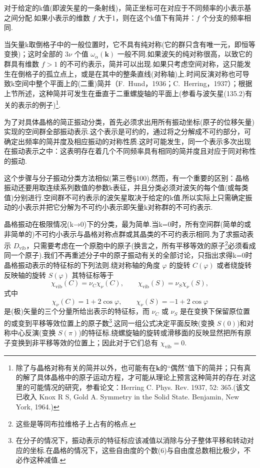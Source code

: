 对于给定的k值(即波矢星的一条射线)，简正坐标可在对应于不同频率的小表示基之间分配.如果小表示的维数 $f$ 大于1，则在这个k值下有简并：$f$ 个分支的频率相同.

当矢量k取倒格子中的一般位置时，它不具有纯对称(它的群只含有唯一元，即恒等变换)；这时全部的 $3\nu$ 个值 $\omega_\alpha(\boldsymbol{k})$ 一般不同.如果波矢的纯对称很高，以致它的群具有维数 $f>1$ 的不可约表示，简并可以出现.如果只考虑空间对称，这只能发生在倒格子的孤立点上，或是在其中的整条直线(对称轴)上.时间反演对称也可导致k空间中整个平面上的(二重)简并（F.~Hund，1936；C.~Herring，1937）；根据上节所述，这种简并可发生在垂直于二重螺旋轴的平面上(参看与波矢星(135.2)有关的表示的例子)\footnote{除了与晶格对称有关的简并以外，也可能有在$\boldsymbol{k}$的“偶然”值下的简并；只有真的解了具体晶格中的原子运动方程，才可能从理论上预言这种简并的存在.对这里的可能情况的研究，参看论文：Herring C. Phys. Rev. 1937, 52: 365.(该文已收入 Knox R S, Gold A. Symmetry in the Solid State. Benjamin, New York, 1964.)}.

为了对具体晶格的简正振动分类，首先必须求出用所有振动坐标(原子的位移矢量)实现的空间群全部振动表示.这个表示是可约的，通过将之分解成不可约部分，可确定出频率的简并度及相应振动的对称性质.这时可能发生，同一个表示多次出现在振动表示之中：这表明存在着几个不同频率具有相同的简并度且对应于同对称性的振动.

这个步骤与分子振动分类方法相似(第三卷§100).然而，有一个重要的区别：晶格振动还要用取连续系列数值的参数k表征，并且分类必须对波矢的每个值(或每类值)分别进行.空间群不可约表示的波矢星取决于给定的k值.所以实际上只需确定振动的小表示并把它分解为不可约小表示即矢量k对称群的不可约表示.

晶格振动在极限情况(k→0)下的分类，最为简单.当k=0时，所有空间群(简单的或非简单的)不可约小表示与晶格对称点群或其晶类的不可约表示相同.为了求振动表示 $D_{\mathrm{vib}}$，只需要考虑在一个原胞中的原子(换言之，所有平移等效的原子\footnote{这些是等同布拉维格子上占有的格点.}必须看成同一个原子).我们不再重述分子中的原子振动有关的全部讨论，只指出求得k=0时晶格振动表示的特征标的下列法则.绕对称轴的角度 $\varphi$ 的旋转 $C(\varphi)$ 或者绕旋转反映轴的旋转 $S(\varphi)$ 其特征标等于
\begin{equation}
  \chi_{\mathrm{vib}}(C)=\nu_C\chi_\nu(C),\qquad
  \chi_{\mathrm{vib}}(S)=\nu_S\chi_\nu(S),
\end{equation}
式中
\begin{equation*}
  \chi_\nu(C)=1+2\cos\varphi,\qquad \chi_\nu(S)=-1+2\cos\varphi
\end{equation*}
是(极)矢量的三个分量所给出表示的特征标，而 $\nu_C$ 或 $\nu_S$ 是在变换下保留原位置的或变到平移等效位置上的原子数\footnote{在分子的情况下，振动表示的特征标应该减值以消除与分子整体平移和转动对应的坐标.在晶格的情况下，这些自由度的个数(6)与自由度总数相比极少，不必作这种减值.}.这同一组公式决定平面反映(变换 $S(0)$)和对称中心反演(变换 $S(\pi)$)的特征标.绕螺旋轴的旋转或滑移面的反映显然把所有原子变换到非平移等效的位置上；因此对于它们总有 $\chi_{\mathrm{vib}}=0$.

